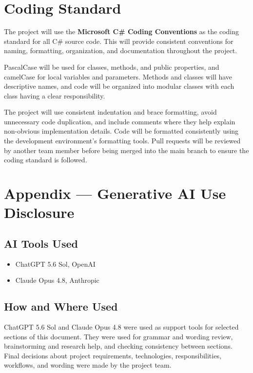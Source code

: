 \documentclass{article}
\begin{document}
\section{Coding Standard}

The project will use the \textbf{Microsoft C\# Coding Conventions} as the coding standard for all C\# source code. This will provide consistent conventions for naming, formatting, organization, and documentation throughout the project.

\vspace{1em}

\noindent PascalCase will be used for classes, methods, and public properties, and camelCase for local variables and parameters. Methods and classes will have descriptive names, and code will be organized into modular classes with each class having a clear responsibility.

\vspace{1em}

\noindent The project will use consistent indentation and brace formatting, avoid unnecessary code duplication, and include comments where they help explain non-obvious implementation details. Code will be formatted consistently using the development environment's formatting tools. Pull requests will be reviewed by another team member before being merged into the main branch to ensure the coding standard is followed.

\newpage{}

\section{Appendix --- Generative AI Use Disclosure}

\subsection{AI Tools Used}

\begin{itemize}
    \item ChatGPT 5.6 Sol, OpenAI
    \item Claude Opus 4.8, Anthropic
\end{itemize}

\subsection{How and Where Used}

ChatGPT 5.6 Sol and Claude Opus 4.8 were used as support tools for selected sections of this
document. They were used for grammar and wording review, brainstorming and research help,
and checking consistency between sections. Final decisions about project requirements,
technologies, responsibilities, workflows, and wording were made by the project team.
\end{document}
